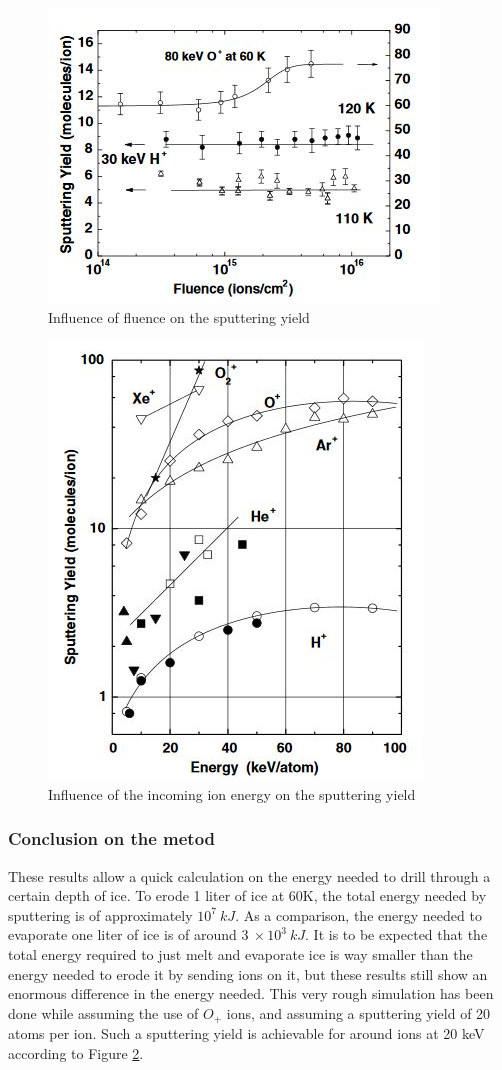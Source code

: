 \begin{figure}[htb]
\centering
\includegraphics[width=.48\textwidth]{figures/Paul/sputteringfluence}
\caption{Influence of fluence on the sputtering yield}
\label{sputteringfluence}
\end{figure}
    
\begin{figure}[htb]
\centering
\includegraphics[width=.48\textwidth]{figures/Paul/sputteringenergy}
\caption{Influence of the incoming ion energy on the sputtering yield}
\label{sputteringenergy}
\end{figure}

\subsubsection{Conclusion on the metod}

These results allow a quick calculation on the energy needed to drill through a certain depth of ice. To erode 1 liter of ice at 60K, the total energy needed by sputtering is of approximately $10^{7}~kJ$. As a comparison, the energy needed to evaporate one liter of ice is of around $3~\times10^{3}~kJ$. It is to be expected that the total energy required to just melt and evaporate ice is way smaller than the energy needed to erode it by sending ions on it, but these results still show an enormous difference in the energy needed. This very rough simulation has been done while assuming the use of $O_{+}$ ions, and assuming a sputtering yield of 20 atoms per ion. Such a sputtering yield is achievable for around ions at 20 keV according to Figure \ref{sputteringenergy}.\\

